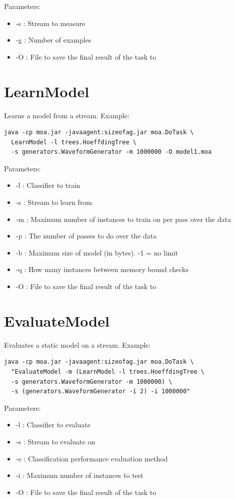 \documentclass[a4paper,12pt,twoside]{book}
\begin{document}
Parameters:
\begin{itemize}
\item -s : Stream to measure
\item -g : Number of examples
\item -O : File to save the final result of the task to
\end{itemize}

\section{LearnModel} 
Learns a model from a stream.
Example:
\begin{footnotesize}\begin{verbatim}
java -cp moa.jar -javaagent:sizeofag.jar moa.DoTask \
  LearnModel -l trees.HoeffdingTree \
  -s generators.WaveformGenerator -m 1000000 -O model1.moa
\end{verbatim}\end{footnotesize}

Parameters:
\begin{itemize}
\item -l : Classifier to train
\item -s : Stream to learn from
\item -m : Maximum number of instances to train on per pass over the data
\item -p : The number of passes to do over the data
\item -b : Maximum size of model (in bytes). -1 = no limit
\item -q : How many instances between memory bound checks
\item -O : File to save the final result of the task to
\end{itemize}

\section{EvaluateModel} 
Evaluates a static model on a stream.
Example:
\begin{footnotesize}\begin{verbatim}
java -cp moa.jar -javaagent:sizeofag.jar moa.DoTask \
  "EvaluateModel -m (LearnModel -l trees.HoeffdingTree \
  -s generators.WaveformGenerator -m 1000000) \
  -s (generators.WaveformGenerator -i 2) -i 1000000"
\end{verbatim}\end{footnotesize}

Parameters:
\begin{itemize}
\item -l : Classifier to evaluate
\item -s : Stream to evaluate on
\item -e : Classification performance evaluation method
\item -i : Maximum number of instances to test
\item -O : File to save the final result of the task to
\end{itemize}
\end{document}
